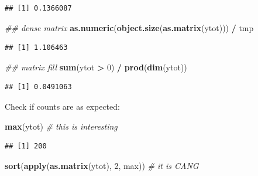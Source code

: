 \documentclass[12pt,]{scrbook}
\newenvironment{Shaded}{\begin{snugshade}}{\end{snugshade}}
\newcommand{\CommentTok}[1]{\textcolor[rgb]{0.56,0.35,0.01}{\textit{#1}}}
\newcommand{\DecValTok}[1]{\textcolor[rgb]{0.00,0.00,0.81}{#1}}
\newcommand{\KeywordTok}[1]{\textcolor[rgb]{0.13,0.29,0.53}{\textbf{#1}}}
\newcommand{\NormalTok}[1]{#1}
\newcommand{\OperatorTok}[1]{\textcolor[rgb]{0.81,0.36,0.00}{\textbf{#1}}}
\newcommand{\StringTok}[1]{\textcolor[rgb]{0.31,0.60,0.02}{#1}}
\begin{document}
\begin{verbatim}
## [1] 0.1366087
\end{verbatim}

\begin{Shaded}
\begin{Highlighting}[]
\CommentTok{## dense matrix}
\KeywordTok{as.numeric}\NormalTok{(}\KeywordTok{object.size}\NormalTok{(}\KeywordTok{as.matrix}\NormalTok{(ytot))) }\OperatorTok{/}\StringTok{ }\NormalTok{tmp}
\end{Highlighting}
\end{Shaded}

\begin{verbatim}
## [1] 1.106463
\end{verbatim}

\begin{Shaded}
\begin{Highlighting}[]
\CommentTok{## matrix fill}
\KeywordTok{sum}\NormalTok{(ytot }\OperatorTok{>}\StringTok{ }\DecValTok{0}\NormalTok{) }\OperatorTok{/}\StringTok{ }\KeywordTok{prod}\NormalTok{(}\KeywordTok{dim}\NormalTok{(ytot))}
\end{Highlighting}
\end{Shaded}

\begin{verbatim}
## [1] 0.0491063
\end{verbatim}

Check if counts are as expected:

\begin{Shaded}
\begin{Highlighting}[]
\KeywordTok{max}\NormalTok{(ytot) }\CommentTok{# this is interesting}
\end{Highlighting}
\end{Shaded}

\begin{verbatim}
## [1] 200
\end{verbatim}

\begin{Shaded}
\begin{Highlighting}[]
\KeywordTok{sort}\NormalTok{(}\KeywordTok{apply}\NormalTok{(}\KeywordTok{as.matrix}\NormalTok{(ytot), }\DecValTok{2}\NormalTok{, max)) }\CommentTok{# it is CANG}
\end{Highlighting}
\end{Shaded}
\end{document}
